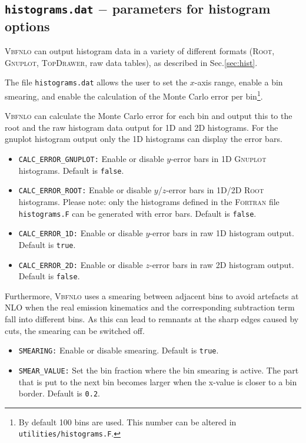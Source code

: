 \documentclass[english,12pt]{article}
\begin{document}


\subsection{{\tt histograms.dat} $-$ parameters for histogram options}
\label{sec:histdat}

\textsc{Vbfnlo} can output histogram data in a variety of different formats
(\textsc{Root}, \textsc{Gnuplot}, \textsc{TopDrawer}, raw data tables), as
described in Sec.\ref{sec:hist}.

The file {\tt histograms.dat} allows the user to set the $x$-axis range,
enable a bin smearing, and enable the calculation of the Monte Carlo
error per bin\footnote{By default 100 bins are used.  This number can
be altered in {\tt utilities/histograms.F}.}.

\noindent\textsc{Vbfnlo} can calculate the Monte Carlo error for each bin and output
this to the root and the raw histogram data output for 1D and 2D histograms.
For the gnuplot histogram output only the 1D histograms can display the error bars.
%
\begin{itemize}
 \item {\tt CALC\_ERROR\_GNUPLOT:} Enable or disable $y$-error bars in 1D \textsc{Gnuplot} histograms.
                                   Default is {\tt false}.
 \item {\tt CALC\_ERROR\_ROOT:} Enable or disable $y$/$z$-error bars in 1D/2D \textsc{Root} histograms.
                                Please note: only the histograms defined in the \textsc{Fortran}
                                file {\tt histograms.F} can be generated with error bars.
                                Default is {\tt false}.
 \item {\tt CALC\_ERROR\_1D:} Enable or disable $y$-error bars in raw 1D histogram output.
                              Default is {\tt true}.
 \item {\tt CALC\_ERROR\_2D:} Enable or disable $z$-error bars in raw 2D histogram output.
                              Default is {\tt false}.
\end{itemize}
%
Furthermore, \textsc{Vbfnlo} uses a smearing between adjacent bins to avoid
artefacts at NLO when the real emission kinematics and the corresponding
subtraction term fall into different bins. As this can lead to remnants at the sharp
edges caused by cuts, the smearing can be switched off.
\begin{itemize}
 \item {\tt SMEARING:} Enable or disable smearing.  Default is {\tt true}.
 \item {\tt SMEAR\_VALUE:} Set the bin fraction where the bin smearing is active.
                          The part that is put to the next bin becomes larger when
                          the x-value is closer to a bin border. Default is {\tt 0.2}.
\end{itemize}
\end{document}
